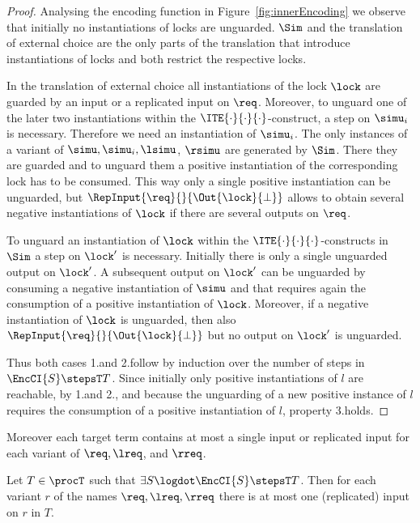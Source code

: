 \documentclass[]{eptcs}
\begin{document}
\begin{proof}
	Analysing the encoding function in Figure~\ref{fig:innerEncoding} we observe that initially no instantiations of locks are unguarded. $ \Sim $ and the translation of external choice are the only parts of the translation that introduce instantiations of locks and both restrict the respective locks.
	
	In the translation of external choice all instantiations of the lock $ \lock $ are guarded by an input or a replicated input on $ \req $. Moreover, to unguard one of the later two instantiations within the $ \ITE{\cdot}{\cdot}{\cdot} $-construct, a step on $ \simu_i $ is necessary. Therefore we need an instantiation of $ \simu_i $. The only instances of a variant of $ \simu, \simu_i, \lsimu $, $ \rsimu $ are generated by $ \Sim $. There they are guarded and to unguard them a positive instantiation of the corresponding lock has to be consumed. This way only a single positive instantiation can be unguarded, but $ \RepInput{\req}{}{\Out{\lock}{\bot}} $ allows to obtain several negative instantiations of $ \lock $ if there are several outputs on $ \req $.
	
	To unguard an instantiation of $ \lock $ within the $ \ITE{\cdot}{\cdot}{\cdot} $-constructs in $ \Sim $ a step on $ \lock' $ is necessary. Initially there is only a single unguarded output on $ \lock' $. A subsequent output on $ \lock' $ can be unguarded  by consuming a negative instantiation of $ \simu $ and that requires again the consumption of a positive instantiation of $ \lock $. Moreover, if a negative instantiation of $ \lock $ is unguarded, then also $ \RepInput{\req}{}{\Out{\lock}{\bot}} $ but no output on $ \lock' $ is unguarded.
	
	Thus both cases 1.\@ and 2.\@ follow by induction over the number of steps in $ \EncCI{S} \stepsT T $. Since initially only positive instantiations of $ l $ are reachable, by 1.\@ and 2., and because the unguarding of a new positive instance of $ l $ requires the consumption of a positive instantiation of $ l $, property 3.\@ holds.
\end{proof}

Moreover each target term contains at most a single input or replicated input for each variant of $ \req, \lreq $, and $ \rreq $.

\begin{lemma}
	Let $ T \in \procT $ such that $ \exists S\logdot \EncCI{S} \stepsT T $. Then for each variant $ r $ of the names $ \req, \lreq, \rreq $ there is at most one (replicated) input on $ r $ in $ T $.
	\label{lem:reqLocks}
\end{lemma}
\end{document}

